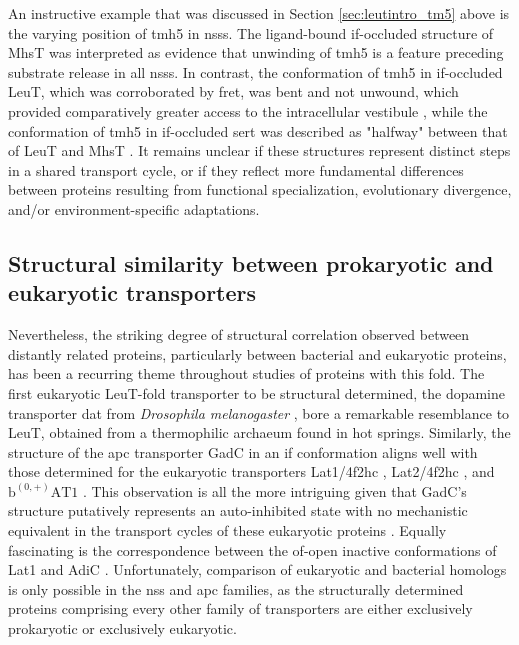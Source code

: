 An instructive example that was discussed in Section \ref{sec:leutintro_tm5} above is the varying position of \gls{tmh}5 in \gls{nss}s. The ligand-bound \gls{if}-occluded structure of MhsT \citep*{Malinauskaite2014, Stolzenberg2017} was interpreted as evidence that unwinding of \gls{tmh}5 is a feature preceding substrate release in all \gls{nss}s. In contrast, the conformation of \gls{tmh}5 in \gls{if}-occluded LeuT, which was corroborated by \gls{fret}, was bent and not unwound, which provided comparatively greater access to the intracellular vestibule \citep*{Gotfryd2020, Terry2018}, while the conformation of \gls{tmh}5 in \gls{if}-occluded \gls{sert} was described as "halfway" between that of LeuT and MhsT \citep*{Coleman2019}. It remains unclear if these structures represent distinct steps in a shared transport cycle, or if they reflect more fundamental differences between proteins resulting from functional specialization, evolutionary divergence, and/or environment-specific adaptations.

\subsection{Structural similarity between prokaryotic and eukaryotic transporters}

Nevertheless, the striking degree of structural correlation observed between distantly related proteins, particularly between bacterial and eukaryotic proteins, has been a recurring theme throughout studies of proteins with this fold. The first eukaryotic LeuT-fold transporter to be structural determined, the dopamine transporter \gls{dat} from \emph{Drosophila melanogaster} \citep*{Penmatsa2013}, bore a remarkable resemblance to LeuT, obtained from a thermophilic archaeum found in hot springs. Similarly, the structure of the \gls{apc} transporter GadC in an \gls{if} conformation \citep*{Ma2012} aligns well with those determined for the eukaryotic transporters Lat1/4f2hc \citep*{Lee2019, Yan2021, Yan2019}, Lat2/4f2hc \citep*{Jeckelmann2020, Yan2020}, and $\mathrm{b^{(0,+)}AT1}$ \citep*{Wu2020, Yan2020a}. This observation is all the more intriguing given that GadC's structure putatively represents an auto-inhibited state with no mechanistic equivalent in the transport cycles of these eukaryotic proteins \citep*{Ma2012, Ma2013}. Equally fascinating is the correspondence between the \gls{of}-open inactive conformations of Lat1 \citep*{Yan2021} and AdiC \citep*{Ilgu2016}. Unfortunately, comparison of eukaryotic and bacterial homologs is only possible in the \gls{nss} and \gls{apc} families, as the structurally determined proteins comprising every other family of transporters are either exclusively prokaryotic or exclusively eukaryotic.

